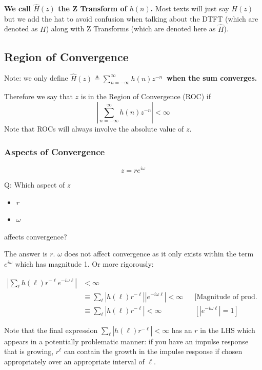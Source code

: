 \textbf{We call $\hat H(z)$ the Z Transform of $h(n)$.} Most texts will just say $H(z)$ but we add the hat to avoid confusion when talking about the DTFT (which are denoted as $H$) along with Z Transforms (which are denoted here as $\hat H$).

\subsection{Region of Convergence}
Note: we only define $\displaystyle\hat H(z)\triangleq\sum_{n=-\infty}^\infty h(n)z^{-n}\ $ \textbf{when the sum converges.}

Therefore we say that $z$ is in the Region of Convergence (ROC) if
\[
    \left|\sum_{n=-\infty}^\infty h(n)z^{-n}\right| < \infty
\]
Note that ROCs will always involve the absolute value of $z$.

\subsubsection{Aspects of Convergence}
\[
    z=re^{i\omega}
\]
\begin{shaded}
Q: Which aspect of $z$
\begin{itemize}
    \item $r$
    \item $\omega$
\end{itemize}
affects convergence?
\end{shaded}

The answer is $r$. $\omega$ does not affect convergence as it only exists within the term $e^{i\omega}$ which has magnitude 1. Or more rigorously:

\begin{align*}
    \left|\sum_\ell h(\ell)r^{-\ell}e^{-i\omega\ell}\right|&<\infty
    \\
    &\equiv
    \sum_\ell \left|h(\ell)r^{-\ell}\right|\left|e^{-i\omega\ell}\right|
    <\infty
    &&\text{[Magnitude of prod. = prod. of the magnitudes]}
    \\
    &\equiv
    \sum_\ell \left|h(\ell)r^{-\ell}\right|
    <\infty
    &&\text{$\left[|e^{-i\omega\ell}|=1\right]$}
\end{align*}

Note that the final expression $\sum_\ell \left|h(\ell)r^{-\ell}\right|<\infty$ has an $r$ in the LHS which appears in a potentially problematic manner:
if you have an impulse response that is growing, $r^\ell$ can contain the growth in the impulse response if chosen appropriately over an appropriate interval of $\ell$.

